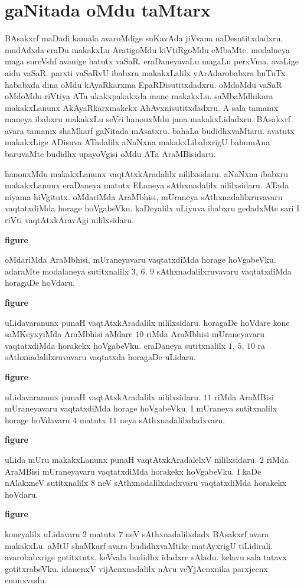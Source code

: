 \chapter{gaNitada oMdu taMtarx}

BAsakxrf maDadi kamala avaroMdige suKavAda jiVvana naDesutitxdadxru. mudAdxda eraDu makakxLu AratigoMdu kiVtiRgoMdu eMbaMte. modalneya maga sureVshf avanige hatutx vaSaR. eraDaneyavaLu magaLu perxVma. avaLige aidu vaSaR. parxti vaSaRvU ibabxru makakxLalilx yArAdarobabxra huTuTx hababxda dina oMdu kAyaRkarxma EpaRDisutitxdadxru. oMdoMdu vaSaR oMdoMdu riVtiya ATa akakxpakakxda mane makakxLu. saMbaMdhikara makakxLanunx AkAyaRkarxmakekx AhAvxnisutitxdadxru. A sala tamamx maneya ibabxru makakxLu seVri hanonxMdu jana makakxLidadxru. BAsakxrf avara tamamx shaMkarf gaNitada mAsatxru. bahaLa budidhxvaMtaru. avatutx makakxLige ADisuva ATadalilx aNaNxna makakxLibabxrigU bahumAna baruvaMte budidhx upayoVgisi oMdu ATa AraMBisidaru.

hanonxMdu makakxLanunx vaqtAtxkAradalilx nililxsidaru. aNaNxna ibabxru makakxLanunx eraDaneya matutx ELaneya sAthxnadalilx nililxsidaru. ATada niyama hiVgitutx. oMdariMda AraMbhisi, mUraneya sAthxnadalilxruvavaru vaqtatxdiMda horage hoVgabeVku. kaDeyalilx uLiyuva ibabxru gedadxMte sari I riVti vaqtAtxkAravAgi nililxsidaru.
\begin{center}
 {\bf{\rm figure}}
\end{center}

oMdariMda AraMbhisi, mUraneyavaru vaqtatxdiMda horage hoVgabeVku. adaraMte modalaneya sutitxnalilx $3$, $6$, $9$ sAthxnadalilxruvavaru vaqtatxdiMda horagaDe hoVdaru.
\begin{center}
 {\bf{\rm figure}}
\end{center}

uLidavaranunx punaH vaqtAtxkAradalilx nililxsidaru. horagaDe hoVdare kone saMKeyxyiMda AraMbhisi aMdare $10$ riMda AraMbhisi mUraneyavaru vaqtatxdiMda horakekx hoVgabeVku. eraDaneya sutitxnalilx $1$, $5$, $10$ ra sAthxnadalilxruvavaru vaqtatxda horagaDe uLidaru.
\begin{center}
 {\bf{\rm figure}}
\end{center}

uLidavaranunx punaH vaqtAtxkAradalilx nililxsidaru. $11$ riMda AraMBisi mUraneyavaru vaqtatxdiMda horage hoVgabeVku. I mUraneya sutitxnalilx horage hoVdavaru $4$ matutx $11$ neya sAthxnadalilxdadxvaru. 
\begin{center}
 {\bf{\rm figure}}
\end{center}

uLida mUru makakxLanunx punaH vaqtAtxkAradalelxV nililxsidaru. $2$ riMda AraMBisi mUraneyavaru vaqtatxdiMda horakekx hoVgabeVku. I kaDe nAlakxneV sutitxnalilx $8$ neV sAthxnadalilxdadxvaru vaqtatxdiMda horakekx hoVdaru.
\begin{center}
 {\bf{\rm figure}}
\end{center}

koneyalilx uLidavaru $2$ matutx $7$ neV sAthxnadalilxdadx BAsakxrf avara makakxLu. aMtU shaMkarf avara budidhxvaMtike matAyxrigU tiLidirali. avarobabxrige gotitxtutx. keVvala budidhx idadxre sAladu. kelavu sala tatavx gotitxrabeVku. idanenxV vijAcnxnadalilx nAvu veYjAcnxnika parxjecnx enunxvudu. 
